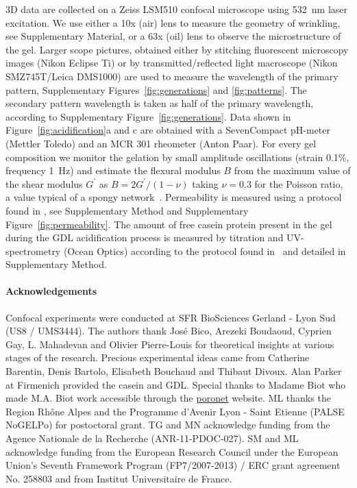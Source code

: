 \documentclass[twocolumn,superscriptaddress,showpacs,preprintnumbers,
amsmath,amssymb,prl]{revtex4-1}
\begin{document}
3D data are collected on a Zeiss LSM510 confocal microscope using \SI{532}{\nano\meter} laser excitation. We use either a 10x (air) lens to measure the geometry of wrinkling, see Supplementary Material, or a 63x (oil) lens to observe the microstructure of the gel. Larger scope pictures, obtained either by stitching fluorescent microscopy images (Nikon Eclipse Ti) or by transmitted/reflected light macroscope (Nikon SMZ745T/Leica DMS1000) are used to measure the wavelength of the primary pattern, Supplementary Figures~\ref{fig:generations} and \ref{fig:patterns}. The secondary pattern wavelength is taken as half of the primary wavelength, according to Supplementary Figure~\ref{fig:generations}.
Data shown in Figure~\ref{fig:acidification}a and c are obtained with a SevenCompact pH-meter (Mettler Toledo) and an MCR 301 rheometer (Anton Paar). For every gel composition we monitor the gelation by small amplitude oscillations (strain 0.1\%, frequency \SI{1}{\hertz}) and estimate the flexural modulus $B$ from the maximum value of the shear modulus $G^\prime$ as $B=2G^\prime/(1-\nu)$ taking $\nu=0.3$ for the Poisson ratio, a value typical of a spongy network~\cite{Greaves2011}.
Permeability is measured using a protocol found in \cite{VanDijk1986}, see Supplementary Method and Supplementary Figure~\ref{fig:permeability}. The amount of free casein protein present in the gel during the GDL acidification process is measured by titration and UV-spectrometry (Ocean Optics) according to the protocol found in~\cite{Roefs1986} and detailed in Supplementary Method.




\paragraph*{Acknowledgements}
Confocal experiments were conducted at SFR BioSciences Gerland - Lyon Sud (US8 / UMS3444).
The authors thank Jos\'e Bico, Arezeki Boudaoud, Cyprien Gay, L. Mahadevan and Olivier Pierre-Louis for theoretical insights at various stages of the research. 
Precious experimental ideas came from Catherine Barentin, Denis Bartolo, Elisabeth Bouchaud and Thibaut Divoux.
Alan Parker at Firmenich provided the casein and GDL. 
Special thanks to Madame Biot who made M.A. Biot work accessible through the \href{http://www.olemiss.edu/sciencenet/poronet/}{poronet} website. 
ML thanks the Region Rhône Alpes and the Programme d'Avenir Lyon - Saint Etienne (PALSE NoGELPo) for postoctoral grant. 
TG and MN acknowledge funding from the Agence Nationale de la Recherche (ANR-11-PDOC-027). 
SM and ML acknowledge funding from the European Research Council under the European Union's Seventh Framework Program (FP7/2007-2013) / ERC grant agreement No. 258803 and from Institut Universitaire de France.
\end{document}
